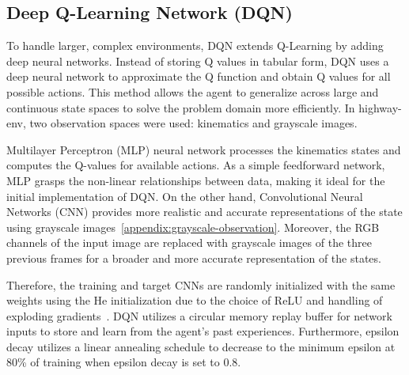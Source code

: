 \documentclass{article}
\begin{document}



\subsection{Deep Q-Learning Network (DQN)}




To handle larger, complex environments, DQN extends Q-Learning by adding deep neural networks.
Instead of storing Q values in tabular form, DQN uses a deep neural network to approximate the Q function and obtain Q values for all possible actions. This method allows the agent to generalize across large and continuous state spaces to solve the problem domain more efficiently. In highway-env, two observation spaces were used: kinematics and grayscale images.

Multilayer Perceptron (MLP) neural network processes the kinematics states and computes the Q-values for available actions. As a simple feedforward network, MLP grasps the non-linear relationships between data, making it ideal for the initial implementation of DQN. On the other hand, Convolutional Neural Networks (CNN) provides more realistic and accurate representations of the state using grayscale images~\ref{appendix:grayscale-observation}. 
Moreover, the RGB channels of the input image are replaced with grayscale images of the three previous frames for a broader and more accurate representation of the states.

Therefore, the training and target CNNs are randomly initialized with the same weights using the He initialization due to the choice of ReLU and handling of exploding gradients~\cite{hekaiming2015}.
DQN utilizes a circular memory replay buffer for network inputs to store and learn from the agent's past experiences.
Furthermore, epsilon decay utilizes a linear annealing schedule to decrease to the minimum epsilon at 80\% of training when epsilon decay is set to 0.8.
\end{document}
